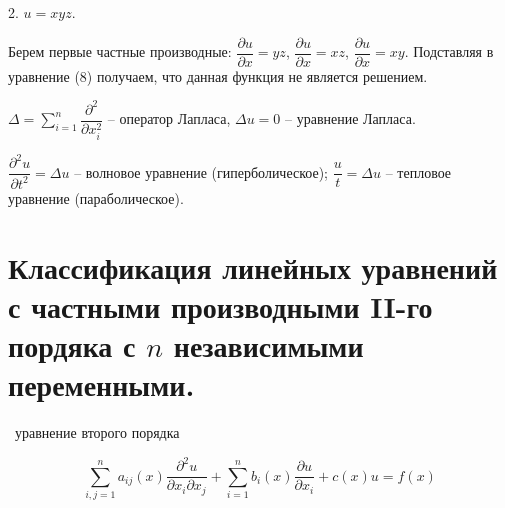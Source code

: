 \documentclass[9pt]{article}
\begin{document}
\par2. \(u=xyz\).
\par Берем первые частные производные: \(\dfrac{\partial u}{\partial x} = yz\), \(\dfrac{\partial u}{\partial x} = xz\), \(\dfrac{\partial u}{\partial x} = xy\). Подставляя в уравнение (8) получаем, что данная функция не является решением.
\par\(\Delta=\displaystyle\sum_{i=1}^n \dfrac{\partial^2}{\partial x_i^2}\) -- оператор Лапласа, \(\Delta u=0\) -- уравнение Лапласа.
\par\(\dfrac{\partial^2u}{\partial t^2} = \Delta u\) -- волновое уравнение (гиперболическое); \(\dfrac{u}{t}=\Delta u\) -- тепловое уравнение (параболическое).

\section{Классификация линейных уравнений с частными производными II-го пордяка с \(n\) независимыми переменными.}

\par\ 
 уравнение второго порядка

\begin{equation}
    \sum^n_{i,j=1}a_{ij}(x)\dfrac{\partial^2 u}{\partial x_i \partial x_j}+\sum^n_{i=1}b_i(x)\dfrac{\partial u}{\partial x_i}+c(x)u=f(x)
\end{equation}
\end{document}
